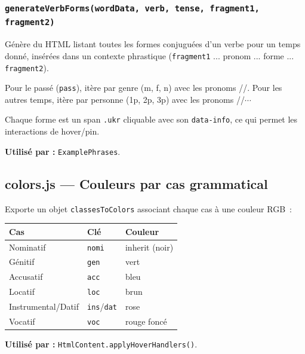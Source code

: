 \subsubsection{\texttt{generateVerbForms(wordData, verb, tense, fragment1, fragment2)}}

Génère du HTML listant toutes les formes conjuguées d'un verbe pour un temps donné, insérées dans un contexte phrastique (\texttt{fragment1} ... pronom ... forme ... \texttt{fragment2}).

Pour le passé (\texttt{pass}), itère par genre (m, f, n) avec les pronoms //. Pour les autres temps, itère par personne (1p, 2p, 3p) avec les pronoms //$\cdots$

Chaque forme est un span \texttt{.ukr} cliquable avec son \texttt{data-info}, ce qui permet les interactions de hover/pin.

\textbf{Utilisé par :} \texttt{ExamplePhrases}.

\subsection{colors.js --- Couleurs par cas grammatical}

Exporte un objet \texttt{classesToColors} associant chaque cas à une couleur RGB~:

\begin{center}
\begin{tabular}{lll}
  \toprule
  \textbf{Cas} & \textbf{Clé} & \textbf{Couleur} \\
  \midrule
  Nominatif & \texttt{nomi} & inherit (noir) \\
  Génitif & \texttt{gen} & \textcolor[rgb]{0.07,0.52,0.18}{vert} \\
  Accusatif & \texttt{acc} & \textcolor[rgb]{0.22,0.02,0.97}{bleu} \\
  Locatif & \texttt{loc} & \textcolor[rgb]{0.52,0.36,0.07}{brun} \\
  Instrumental/Datif & \texttt{ins}/\texttt{dat} & \textcolor[rgb]{0.91,0.16,0.61}{rose} \\
  Vocatif & \texttt{voc} & \textcolor[rgb]{0.52,0.07,0.07}{rouge foncé} \\
  \bottomrule
\end{tabular}
\end{center}

\textbf{Utilisé par :} \texttt{HtmlContent.applyHoverHandlers()}.

